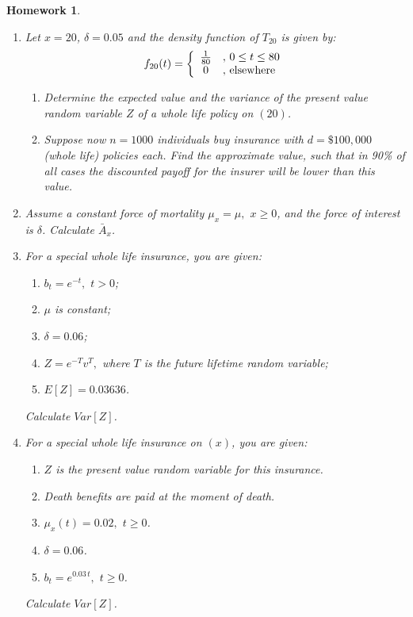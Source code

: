 \documentclass[11pt,fleqn,oneside]{book}
\newtheorem{homework}{Homework}
\begin{document}
\begin{homework}
\label{HW10}
\begin{enumerate}
\item
Let $x=20$, $\delta=0.05$ and the density function of $T_{20}$ is given by:
$$
f_{20}(t)=\left\{
\begin{array}{c l}
\frac{1}{80} &,\,0 \leq t \leq 80\\
0&,\,\text{elsewhere}
\end{array}
\right.
$$
\begin{enumerate}
\item Determine the expected value and the variance of the present value random variable $Z$ of a whole life policy on $(20)$.
\item Suppose now $n=1000$ individuals buy insurance with $d=\$100,000$ (whole life) policies each. Find the approximate value, such that in 90\% of all cases the discounted payoff for the insurer will be lower than this value.
\end{enumerate}
\item Assume a constant force of mortality $\mu_x = \mu,$ $x\geq 0$, and the force of interest is $\delta$. Calculate $\bar{A}_x$.
\item For a special whole life insurance, you are given:
\begin{enumerate}
\item $b_t = e^{-t},$ $t>0$;
\item $\mu$ is constant;
\item $\delta = 0.06$;
\item $Z=e^{-T}v^{T},$ where $T$ is the future lifetime random variable;
\item $E[Z]=0.03636$.
\end{enumerate}
Calculate $Var[Z]$.
\item For a special whole life insurance on $(x)$, you are given:
\begin{enumerate}
\item $Z$ is the present value random variable for this insurance.
\item Death benefits are paid at the moment of death.
\item $\mu_x(t) = 0.02,$ $t \geq 0$.
\item $\delta =0.06$.
\item $b_t = e^{0.03\,t},$ $t \geq 0$.
\end{enumerate}
Calculate $Var[Z]$.
\end{enumerate}
\end{homework}
\end{document}
